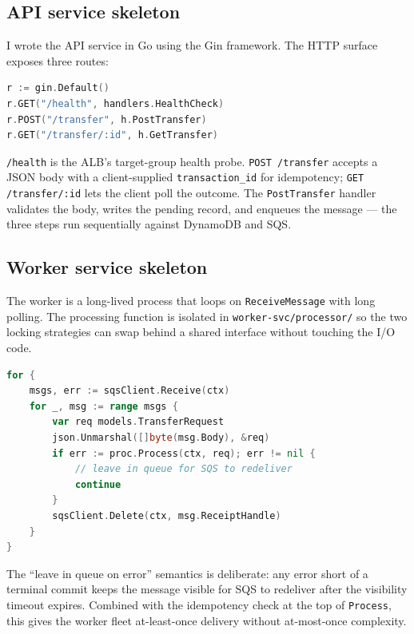 \documentclass[11pt,a4paper]{article}
\begin{document}
\subsection{API service skeleton}

I wrote the API service in Go using the Gin framework. The HTTP surface exposes three routes:

\begin{lstlisting}[language=Go, caption={Route registration in \texttt{api-svc/main.go}.}]
r := gin.Default()
r.GET("/health", handlers.HealthCheck)
r.POST("/transfer", h.PostTransfer)
r.GET("/transfer/:id", h.GetTransfer)
\end{lstlisting}

\texttt{/health} is the ALB's target-group health probe. \texttt{POST /transfer} accepts a JSON body with a client-supplied \texttt{transaction\_id} for idempotency; \texttt{GET /transfer/:id} lets the client poll the outcome. The \texttt{PostTransfer} handler validates the body, writes the pending record, and enqueues the message --- the three steps run sequentially against DynamoDB and SQS.

\subsection{Worker service skeleton}

The worker is a long-lived process that loops on \texttt{ReceiveMessage} with long polling. The processing function is isolated in \texttt{worker-svc/processor/} so the two locking strategies can swap behind a shared interface without touching the I/O code.

\begin{lstlisting}[language=Go, caption={Worker receive loop in \texttt{worker-svc/main.go}.}]
for {
    msgs, err := sqsClient.Receive(ctx)
    for _, msg := range msgs {
        var req models.TransferRequest
        json.Unmarshal([]byte(msg.Body), &req)
        if err := proc.Process(ctx, req); err != nil {
            // leave in queue for SQS to redeliver
            continue
        }
        sqsClient.Delete(ctx, msg.ReceiptHandle)
    }
}
\end{lstlisting}

The ``leave in queue on error'' semantics is deliberate: any error short of a terminal commit keeps the message visible for SQS to redeliver after the visibility timeout expires. Combined with the idempotency check at the top of \texttt{Process}, this gives the worker fleet at-least-once delivery without at-most-once complexity.
\end{document}
